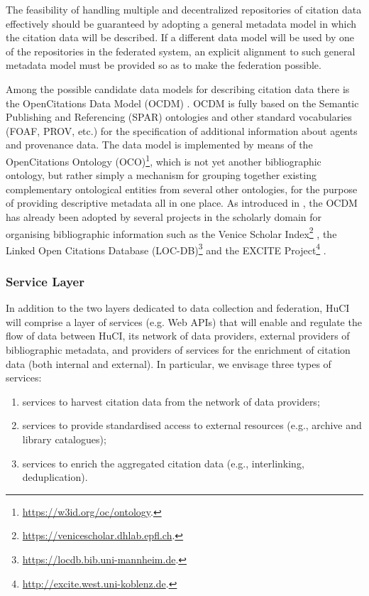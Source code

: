 The feasibility of handling multiple and decentralized repositories of citation data effectively should be guaranteed by adopting a general metadata model in which the citation data will be described. If a different data model will be used by one of the repositories in the federated system, an explicit alignment to such general metadata model must be provided so as to make the federation possible.

Among the possible candidate data models for describing citation data there is the OpenCitations Data Model (OCDM) \cite{peroni_opencitations_2018}. OCDM is fully based on the Semantic Publishing and Referencing (SPAR) ontologies \cite{rutkowski_spar_2018} and other standard vocabularies (FOAF, PROV, etc.) for the specification of additional information about agents and provenance data. The data model is implemented by means of the OpenCitations Ontology (OCO)\footnote{\url{https://w3id.org/oc/ontology}.}, which is not yet another bibliographic ontology, but rather simply a mechanism for grouping together existing complementary ontological entities from several other ontologies, for the purpose of providing descriptive metadata all in one place. As introduced in \cite{pan_opencitations_2020}, the OCDM has already been adopted by several projects in the scholarly domain for organising bibliographic information such as the Venice Scholar Index\footnote{\url{https://venicescholar.dhlab.epfl.ch}.} \cite{colavizza_linked_2018}, the Linked Open Citations Database (LOC-DB)\footnote{\url{https://locdb.bib.uni-mannheim.de}.} \cite{lauscher_linked_2018} and the EXCITE Project\footnote{\url{http://excite.west.uni-koblenz.de}.} \cite{hosseini_excite_2019}.

\subsubsection{Service Layer}

In addition to the two layers dedicated to data collection and federation, HuCI will comprise a layer of services (e.g. Web APIs) that will enable and regulate the flow of data between HuCI, its network of data providers, external providers of bibliographic metadata, and providers of services for the enrichment of citation data (both internal and external). In particular, we envisage three types of services:
\begin{enumerate}
    \item services to harvest citation data from the network of data providers; 
    \item services to provide standardised access to external resources (e.g., archive and library catalogues);
    \item services to enrich the aggregated citation data (e.g., interlinking, deduplication).
\end{enumerate}

